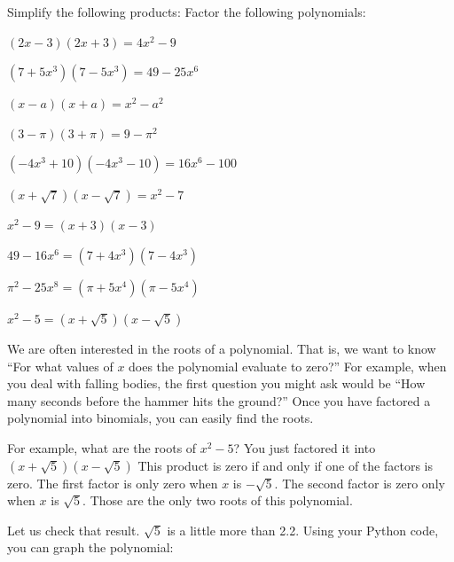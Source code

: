 \begin{Exercise}[title={Difference of Squares}, label=diffsquares]
  Simplify the following products:
  Factor the following polynomials:
\end{Exercise}
\begin{Answer}[ref=diffsquares]
  $(2x - 3)(2x + 3) = 4x^2 - 9$
  
  $(7 + 5x^3)(7 - 5x^3) = 49 - 25x^6$
  
  $(x - a)(x + a) = x^2 - a^2$
  
  $(3 - \pi)(3 + \pi) = 9 - \pi^2$
  
  $(-4x^3 + 10)(-4x^3 - 10) = 16x^6 - 100$
  
  $(x + \sqrt{7})(x - \sqrt{7}) = x^2 - 7$

  $x^2 - 9 = (x + 3)(x - 3)$

  $49 - 16x^6 = (7 + 4x^3)(7 - 4x^3)$
  
  $\pi^2 - 25x^8 = (\pi + 5x^4)(\pi - 5x^4)$
  
  $x^2 - 5 = (x + \sqrt{5})(x - \sqrt{5})$

\end{Answer}

We are often interested in the roots of a polynomial. That is, we want
to know ``For what values of $x$ does the polynomial evaluate to
zero?'' For example, when you deal with falling bodies, the first
question you might ask would be ``How many seconds before the hammer
hits the ground?''  Once you have factored a polynomial into
binomials, you can easily find the roots.

For example, what are the roots of $x^2 - 5$? You just factored it
into $(x + \sqrt{5})(x - \sqrt{5})$ This product is zero if and only
if one of the factors is zero. The first factor is only zero when $x$
is $-\sqrt{5}$. The second factor is zero only when $x$ is
$\sqrt{5}$. Those are the only two roots of this
polynomial.

Let us check that result. $\sqrt{5}$ is a little more than 2.2.  Using
your Python code, you can graph the polynomial:

